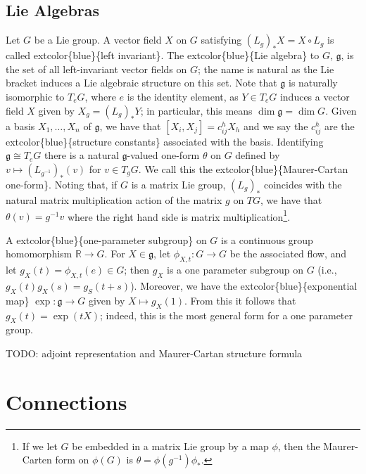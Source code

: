 \documentclass[
]{book}
\begin{document}
\hypertarget{lie-algebras}{%
\section{Lie Algebras}\label{lie-algebras}}

Let \(G\) be a Lie group.
A vector field \(X\) on \(G\) satisfying \((L_g)_* X = X \circ L_g\) is called extcolor\{blue\}\{left invariant\}.
The extcolor\{blue\}\{Lie algebra\} to \(G\), \(\mathfrak{g}\), is the set of all left-invariant vector fields on \(G\); the name is natural as the Lie bracket induces a Lie algebraic structure on this set.
Note that \(\mathfrak{g}\) is naturally isomorphic to \(T_e G\), where \(e\) is the identity element, as \(Y \in T_e G\) induces a vector field \(X\) given by \(X_g = (L_g)_* Y\); in particular, this means \(\dim \mathfrak{g} = \dim G\).
Given a basis \(X_1, \dots, X_n\) of \(\mathfrak{g}\), we have that \([X_i, X_j] = c_{ij}^h X_h\) and we say the \(c_{ij}^h\) are the extcolor\{blue\}\{structure constants\} associated with the basis.
Identifying \(\mathfrak{g} \cong T_e G\) there is a natural \(\mathfrak{g}\)-valued one-form \(\theta\) on \(G\) defined by \(v \mapsto (L_{g^{-1}})_*(v)\) for \(v \in T_g G\).
We call this the extcolor\{blue\}\{Maurer-Cartan one-form\}.
Noting that, if \(G\) is a matrix Lie group, \((L_g)_*\) coincides with the natural matrix multiplication action of the matrix \(g\) on \(TG\), we have that \(\theta(v) = g^{-1}v\) where the right hand side is matrix multiplication\footnote{If we let \(G\) be embedded in a matrix Lie group by a map \(\phi\), then the Maurer-Carten form on \(\phi(G)\) is \(\theta = \phi(g^{-1})\phi_*\).}.

A extcolor\{blue\}\{one-parameter subgroup\} on \(G\) is a continuous group homomorphism \(\mathbb{R} \to G\). For \(X \in \mathfrak{g}\), let \(\phi_{X,t} : G \to G\) be the associated flow, and let \(g_X(t) = \phi_{X,t}(e) \in G\); then \(g_X\) is a one parameter subgroup on \(G\) (i.e., \(g_X(t)g_X(s) = g_S(t+s)\)).
Moreover, we have the extcolor\{blue\}\{exponential map\} \(\exp : \mathfrak{g} \to G\) given by \(X \mapsto g_X(1)\).
From this it follows that \(g_X(t) = \exp(tX)\); indeed, this is the most general form for a one parameter group.

TODO: adjoint representation and Maurer-Cartan structure formula

\hypertarget{connections}{%
\chapter{Connections}\label{connections}}
\end{document}
